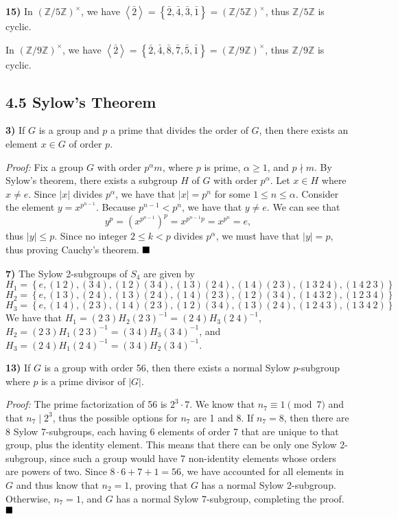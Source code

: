 \documentclass[12pt]{article}
\newcommand{\Z}{\mathbb{Z}}
\newcommand{\angleb}[1]{\left\langle#1\right\rangle}
\newcommand{\braceb}[1]{\left\{#1\right\}}
\newcommand{\parenb}[1]{\left(#1\right)}
\newcommand{\vertb}[1]{\left\vert#1\right\vert}
\newcommand{\proof}{\textit{Proof: }}
\newcommand{\done}{\ensuremath{\strut\hfill\blacksquare}}
\begin{document}
\textbf{15)}
In \( (\Z/5\Z)^\times \), we have
\( \angleb{\bar2} = \braceb{\bar2, \bar4, \bar3, \bar1} = (\Z/5\Z)^\times \),
thus \( \Z/5\Z \) is cyclic.

In \( (\Z/9\Z)^\times \), we have
\(
	\angleb{\bar2}
	= \braceb{\bar2, \bar4, \bar8, \bar7, \bar5, \bar1}
	= (\Z/9\Z)^\times
\),
thus \( \Z/9\Z \) is cyclic.

\subsection*{4.5 Sylow's Theorem}

\textbf{3)}
If \( G \) is a group and \( p \) a prime that divides the order of \( G \),
then there exists an element \( x \in G \) of order \( p \).

\proof
Fix a group \( G \) with order \( p^\alpha m \), where \( p \) is prime,
\( \alpha \geq 1 \), and \( p \nmid m \).
By Sylow's theorem, there exists a subgroup \( H \) of \( G \) with order
\( p^\alpha \).
Let \( x \in H \) where \( x \ne e \).
Since \( \vertb{x} \) divides \( p^\alpha \), we have that
\( \vertb{x} = p^n \) for some \( 1 \leq n \leq \alpha \).
Consider the element \( y = x^{p^{n - 1}} \).
Because \( p^{n - 1} < p^n \), we have that \( y \ne e \).
We can see that
\[
	y^p
	= \parenb{x^{p^{n - 1}}}^p
	= x^{p^{n - 1}p}
	= x^{p^n}
	= e,
\]
thus \( \vertb{y} \leq p \).
Since no integer \( 2 \leq k < p \) divides \( p^\alpha \), we must have that
\( \vertb{y} = p \), thus proving Cauchy's theorem.
\done

\textbf{7)}
The Sylow 2-subgroups of \( S_4 \) are given by
\[
	H_1
	= \braceb{
		e, (1\ 2), (3\ 4), (1\ 2)(3\ 4), (1\ 3)(2\ 4), (1\ 4)(2\ 3),
		(1\ 3\ 2\ 4), (1\ 4\ 2\ 3)
	}
\]
\[
	H_2
	= \braceb{
		e, (1\ 3), (2\ 4), (1\ 3)(2\ 4), (1\ 4)(2\ 3), (1\ 2)(3\ 4),
		(1\ 4\ 3\ 2), (1\ 2\ 3\ 4)
	}
\]
\[
	H_3
	= \braceb{
		e, (1\ 4), (2\ 3), (1\ 4)(2\ 3), (1\ 2)(3\ 4), (1\ 3)(2\ 4),
		(1\ 2\ 4\ 3), (1\ 3\ 4\ 2)
	}
\]
We have that \( H_1 = (2\ 3)H_2(2\ 3)^{-1} = (2\ 4)H_3(2\ 4)^{-1} \),
\( H_2 = (2\ 3)H_1(2\ 3)^{-1} = (3\ 4)H_3(3\ 4)^{-1} \), and
\( H_3 = (2\ 4)H_1(2\ 4)^{-1} = (3\ 4)H_2(3\ 4)^{-1} \).

\textbf{13)}
If \( G \) is a group with order 56, then there exists a normal Sylow
\( p \)-subgroup where \( p \) is a prime divisor of \( \vertb{G} \).

\proof
The prime factorization of 56 is \( 2^3 \cdot 7 \).
We know that \( n_7 \equiv 1 \pmod{7} \) and that \( n_7 \mid 2^3 \), thus the
possible options for \( n_7 \) are 1 and 8.
If \( n_7 = 8 \), then there are 8 Sylow 7-subgroups, each having 6 elements
of order 7 that are unique to that group, plus the identity element.
This means that there can be only one Sylow 2-subgroup, since such a group
would have 7 non-identity elements whose orders are powers of two.
Since \( 8 \cdot 6 + 7 + 1 = 56 \), we have accounted for all elements in
\( G \) and thus know that \( n_2 = 1 \), proving that \( G \) has a normal
Sylow 2-subgroup.
Otherwise, \( n_7 = 1 \), and \( G \) has a normal Sylow 7-subgroup, completing
the proof.
\done
\end{document}
